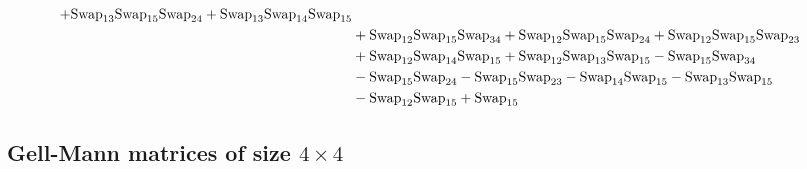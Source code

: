 \documentclass[12pt,dvipsnames,accepted=2016-08-18,a4paper,onecolumn]{quantumarticle}
\numberwithin{equation}{section}
\theoremstyle{definition}
\begin{document}
\begin{align*}
        + \textnormal{Swap}_{13} \textnormal{Swap}_{15} \textnormal{Swap}_{24} + \textnormal{Swap}_{13} \textnormal{Swap}_{14} \textnormal{Swap}_{15}\\ & + \textnormal{Swap}_{12} \textnormal{Swap}_{15} \textnormal{Swap}_{34} + \textnormal{Swap}_{12} \textnormal{Swap}_{15} \textnormal{Swap}_{24} + \textnormal{Swap}_{12} \textnormal{Swap}_{15} \textnormal{Swap}_{23}\\ & +
        \textnormal{Swap}_{12} \textnormal{Swap}_{14} \textnormal{Swap}_{15} + \textnormal{Swap}_{12} \textnormal{Swap}_{13} \textnormal{Swap}_{15} - \textnormal{Swap}_{15} \textnormal{Swap}_{34}\\ & - \textnormal{Swap}_{15} \textnormal{Swap}_{24} - \textnormal{Swap}_{15} \textnormal{Swap}_{23} - \textnormal{Swap}_{14} \textnormal{Swap}_{15} -
        \textnormal{Swap}_{13} \textnormal{Swap}_{15}\\ & - \textnormal{Swap}_{12} \textnormal{Swap}_{15} + \textnormal{Swap}_{15}\\
\end{align*}



\subsection{Gell-Mann matrices of size $4 \times 4$}\label{subsec: gm4}
\end{document}
